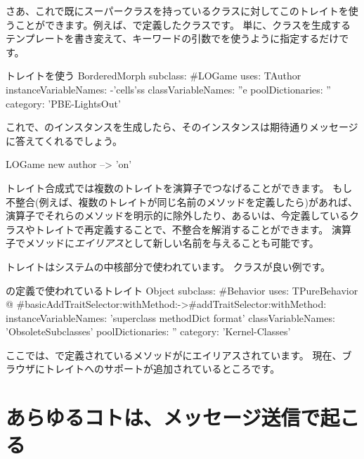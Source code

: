 \documentclass[a4paper,10pt,twoside]{book}
\begin{document}
\noindent
さあ、これで既にスーパークラスを持っているクラスに対してこのトレイトを使うことができます。例えば、で定義したクラスです。
単に、クラスを生成するテンプレートを書き変えて、キーワードの引数でを使うように指定するだけです。

\begin{classdef}[sbegamewithtrait]{トレイトを使う}
BorderedMorph subclass: #LOGame
	uses: TAuthor
	instanceVariableNames: -'cells'ss
	classVariableNames: ''e
	poolDictionaries: ''
	category: 'PBE-LightsOut'
\end{classdef}

これで、のインスタンスを生成したら、そのインスタンスは期待通りメッセージに答えてくれるでしょう。

\begin{code}{}
LOGame new author --> 'on'
\end{code}

トレイト合成式では複数のトレイトを\ct{+}演算子でつなげることができます。
もし不整合(例えば、複数のトレイトが同じ名前のメソッドを定義したら)があれば、\ct{-}演算子でそれらのメソッドを明示的に除外したり、あるいは、今定義しているクラスやトレイトで再定義することで、不整合を解消することができます。
演算子でメソッドに\emph{エイリアス}として新しい名前を与えることも可能です。

トレイトはシステムの中核部分で使われています。
\mbox{}クラスが良い例です。

\begin{classdef}[behaviorwithtraits]{の定義で使われているトレイト}
Object subclass: #Behavior
	uses: TPureBehavior @ {#basicAddTraitSelector:withMethod:->#addTraitSelector:withMethod:}
	instanceVariableNames: 'superclass methodDict format'
	classVariableNames: 'ObsoleteSubclasses'
	poolDictionaries: ''
	category: 'Kernel-Classes'
\end{classdef}
\noindent
ここでは、で定義されているメソッドがにエイリアスされています。
現在、ブラウザにトレイトへのサポートが追加されているところです。

\section{あらゆるコトは、メッセージ送信で起こる}

\end{document}
